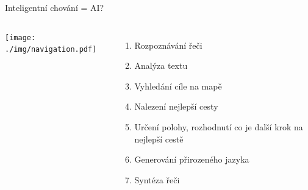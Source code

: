 \documentclass[handout,aspectratio=169,dvipsnames]{beamer}
\begin{document}

\begin{frame}{Inteligentní chování = AI?}

    \begin{columns}
        \texttt{[image: ./img/navigation.pdf]}


        \begin{enumerate}

            \item<2-> Rozpoznávání řeči \\

            \item<3-> Analýza textu \\

            \item<4-> Vyhledání cíle na mapě \\

            \item<5-> Nalezení nejlepší cesty \\

            \item<6-> Určení polohy, rozhodnutí co je další krok na nejlepší cestě

            \item<7-> Generování přirozeného jazyka \\

            \item<8-> Syntéza řeči \\

        \end{enumerate}

    \end{columns}

\end{frame}
\end{document}
